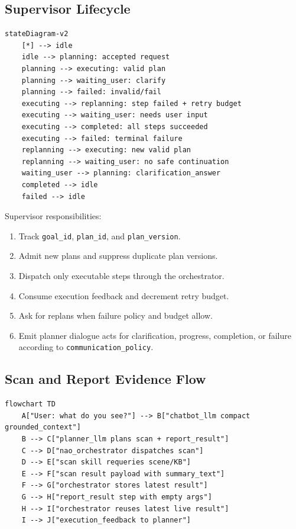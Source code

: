\documentclass[12pt,a4paper]{article}
\newcommand{\code}[1]{\texttt{#1}}
\begin{document}
\subsection{Supervisor Lifecycle}

\begin{lstlisting}[caption={Diagram source from canonical Markdown}]
stateDiagram-v2
    [*] --> idle
    idle --> planning: accepted request
    planning --> executing: valid plan
    planning --> waiting_user: clarify
    planning --> failed: invalid/fail
    executing --> replanning: step failed + retry budget
    executing --> waiting_user: needs user input
    executing --> completed: all steps succeeded
    executing --> failed: terminal failure
    replanning --> executing: new valid plan
    replanning --> waiting_user: no safe continuation
    waiting_user --> planning: clarification_answer
    completed --> idle
    failed --> idle
\end{lstlisting}

Supervisor responsibilities:

\begin{enumerate}
\item Track \code{goal\_id}, \code{plan\_id}, and \code{plan\_version}.
\item Admit new plans and suppress duplicate plan versions.
\item Dispatch only executable steps through the orchestrator.
\item Consume execution feedback and decrement retry budget.
\item Ask for replans when failure policy and budget allow.
\item Emit planner dialogue acts for clarification, progress, completion, or failure according to \code{communication\_policy}.
\end{enumerate}



\subsection{Scan and Report Evidence Flow}

\begin{lstlisting}[caption={Diagram source from canonical Markdown}]
flowchart TD
    A["User: what do you see?"] --> B["chatbot_llm compact grounded_context"]
    B --> C["planner_llm plans scan + report_result"]
    C --> D["nao_orchestrator dispatches scan"]
    D --> E["scan skill requeries scene/KB"]
    E --> F["scan result payload with summary_text"]
    F --> G["orchestrator stores latest result"]
    G --> H["report_result step with empty args"]
    H --> I["orchestrator reuses latest live result"]
    I --> J["execution_feedback to planner"]
\end{lstlisting}
\end{document}
